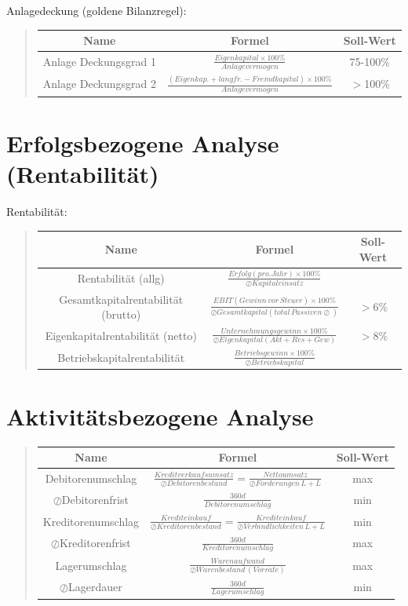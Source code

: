Anlagedeckung (goldene Bilanzregel):
\begin{verse}
\begin{tabular}{|c|c|c|}
\hline 
Name & Formel  & Soll-Wert\tabularnewline
\hline 
\hline 
Anlage Deckungsgrad 1  & $\frac{Eigenkapital\times100\%}{Anlageverm\ddot{o}gen}$ & 75-100\%\tabularnewline
\hline 
Anlage Deckungsgrad 2  & $\frac{(Eigenkap.+langfr.-Fremdkapital)\times100\%}{Anlageverm\ddot{o}gen}$ & $>$100\%\tabularnewline
\hline 
\end{tabular}
\end{verse}

\section*{Erfolgsbezogene Analyse (Rentabilität)}

Rentabilität:
\begin{verse}
\begin{tabular}{|c|c|c|}
\hline 
Name & Formel  & Soll-Wert\tabularnewline
\hline 
\hline 
Rentabilität (allg) & $\frac{Erfolg(pro.Jahr)\times100\%}{\oslash Kapitaleinsatz}$ & \tabularnewline
\hline 
Gesamtkapitalrentabilität (brutto) & $\frac{EBIT(Gewinn\, vor\, Steuer)\times100\%}{\oslash Gesamtkapital(total\, Passiven\oslash)}$ & $>6\%$\tabularnewline
\hline 
Eigenkapitalrentabilität (netto) & $\frac{Unternehmungsgewinn\times100\%}{\oslash Eigenkapital(Akt+Res+Gew)}$ & $>8\%$\tabularnewline
\hline 
Betriebskapitalrentabilität & $\frac{Betriebsgewinn\times100\%}{\oslash Betriebskapital}$ & \tabularnewline
\hline 
\end{tabular}
\end{verse}

\section*{Aktivitätsbezogene Analyse}
\begin{verse}
\begin{tabular}{|c|c|c|}
\hline 
Name & Formel  & Soll-Wert\tabularnewline
\hline 
\hline 
Debitorenumschlag & $\frac{Kreditverkaufsumsatz}{\oslash Debitorenbestand}=\frac{Nettoumsatz}{\oslash Forderungen\, L+L}$ & max\tabularnewline
\hline 
$\oslash$Debitorenfrist & $\frac{360d}{Debitorenumschlag}$ & min\tabularnewline
\hline 
Kreditorenumschlag & $\frac{Krediteinkauf}{\oslash Kreditorenbestand}=\frac{Krediteinkauf}{\oslash Verbindlichkeiten\, L+L}$ & min\tabularnewline
\hline 
$\oslash$Kreditorenfrist & $\frac{360d}{Kreditorenumschlag}$ & max\tabularnewline
\hline 
Lagerumschlag & $\frac{Warenaufwand}{\oslash Warenbestand\,(Vorr\ddot{a}te)}$ & max\tabularnewline
\hline 
$\oslash$Lagerdauer & $\frac{360d}{Lagerumschlag}$ & min\tabularnewline
\hline 
\end{tabular}
\end{verse}

